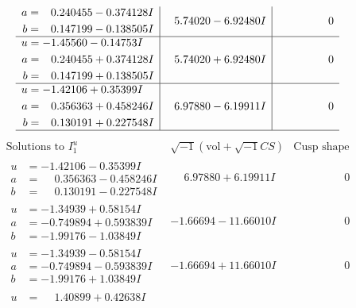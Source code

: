 \documentclass[1p]{elsarticle_modified}
\theoremstyle{definition}
\newcommand{\I}{\sqrt{-1}}
\begin{document}
$$\begin{array}{c|c|c}
\begin{aligned}
a &= \phantom{-}0.240455 - 0.374128 I \\
b &= \phantom{-}0.147199 - 0.138505 I\end{aligned}
 & \phantom{-}5.74020 - 6.92480 I & \phantom{-0.000000 } 0 \\ \hline\begin{aligned}
u &= -1.45560 - 0.14753 I \\
a &= \phantom{-}0.240455 + 0.374128 I \\
b &= \phantom{-}0.147199 + 0.138505 I\end{aligned}
 & \phantom{-}5.74020 + 6.92480 I & \phantom{-0.000000 } 0 \\ \hline\begin{aligned}
u &= -1.42106 + 0.35399 I \\
a &= \phantom{-}0.356363 + 0.458246 I \\
b &= \phantom{-}0.130191 + 0.227548 I\end{aligned}
 & \phantom{-}6.97880 - 6.19911 I & \phantom{-0.000000 } 0\\
 \hline 
 \end{array}$$\newpage$$\begin{array}{c|c|c}  
\text{Solutions to }I^u_{1}& \I (\text{vol} + \sqrt{-1}CS) & \text{Cusp shape}\\
 \hline 
\begin{aligned}
u &= -1.42106 - 0.35399 I \\
a &= \phantom{-}0.356363 - 0.458246 I \\
b &= \phantom{-}0.130191 - 0.227548 I\end{aligned}
 & \phantom{-}6.97880 + 6.19911 I & \phantom{-0.000000 } 0 \\ \hline\begin{aligned}
u &= -1.34939 + 0.58154 I \\
a &= -0.749894 + 0.593839 I \\
b &= -1.99176 - 1.03849 I\end{aligned}
 & -1.66694 - 11.66010 I & \phantom{-0.000000 } 0 \\ \hline\begin{aligned}
u &= -1.34939 - 0.58154 I \\
a &= -0.749894 - 0.593839 I \\
b &= -1.99176 + 1.03849 I\end{aligned}
 & -1.66694 + 11.66010 I & \phantom{-0.000000 } 0 \\ \hline\begin{aligned}
u &= \phantom{-}1.40899 + 0.42638 I \\

\end{aligned}
\end{array}$$
\end{document}
